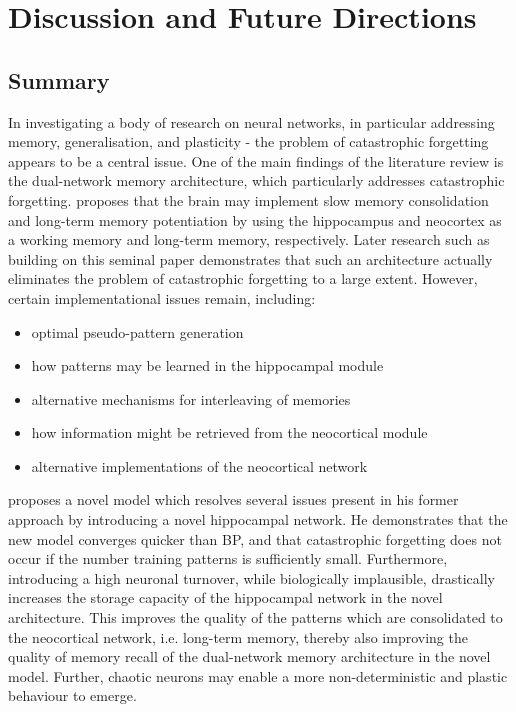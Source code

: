 
\chapter{Discussion and Future Directions}\label{chpt:discussion_future_work}
\section{Summary}


In investigating a body of research on neural networks, in particular addressing memory, generalisation, and plasticity - the problem of catastrophic forgetting appears to be a central issue. One of the main findings of the literature review is the dual-network memory architecture, which particularly addresses catastrophic forgetting. \cite{McClelland1995} proposes that the brain may implement slow memory consolidation and long-term memory potentiation by using the hippocampus and neocortex as a working memory and long-term memory, respectively. Later research such as \citep{French1997, Ans1997, Ans2000, French2001, Hattori2010, Hattori2014} building on this seminal paper demonstrates that such an architecture actually eliminates the problem of catastrophic forgetting to a large extent. However, certain implementational issues remain, including:
\begin{itemize}
\item optimal pseudo-pattern generation
\item how patterns may be learned in the hippocampal module
\item alternative mechanisms for interleaving of memories
\item how information might be retrieved from the neocortical module
\item alternative implementations of the neocortical network
\end{itemize}

\cite{Hattori2014} proposes a novel model which resolves several issues present in his former approach by introducing a novel hippocampal network. He demonstrates that the new model converges quicker than BP, and that catastrophic forgetting does not occur if the number training patterns is sufficiently small. Furthermore, introducing a high neuronal turnover, while biologically implausible, drastically increases the storage capacity of the hippocampal network in the novel architecture. This improves the quality of the patterns which are consolidated to the neocortical network, i.e. long-term memory, thereby also improving the quality of memory recall of the dual-network memory architecture in the novel model. Further, chaotic neurons may enable a more non-deterministic and plastic behaviour to emerge.

